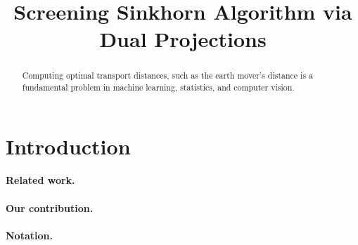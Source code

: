 \documentclass{article}
\title{Screening Sinkhorn Algorithm via Dual Projections}
\begin{document}
\maketitle

\begin{abstract}
Computing optimal transport distances, such as the earth mover's distance is a fundamental problem in machine learning, statistics, and computer vision. 
\end{abstract}

\section{Introduction}


\paragraph{Related work.}

\paragraph{Our contribution.}


\paragraph{Notation.}
\end{document}
